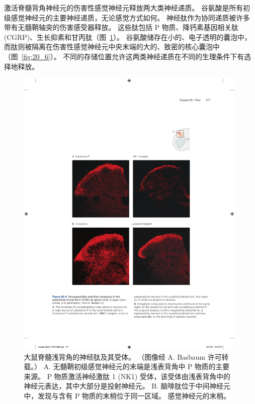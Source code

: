 激活脊髓背角神经元的伤害性感觉神经元释放两大类神经递质。
谷氨酸是所有初级感觉神经元的主要神经递质，无论感觉方式如何。
神经肽作为协同递质被许多带有无髓鞘轴突的伤害感受器释放。
这些肽包括 P 物质、降钙素基因相关肽 (CGRP)、生长抑素和甘丙肽（图~\ref{fig:20_5}）。
谷氨酸储存在小的、电子透明的囊泡中，而肽则被隔离在伤害性感觉神经元中央末端的大的、致密的核心囊泡中（图~\ref{fig:20_6}）。
不同的存储位置允许这两类神经递质在不同的生理条件下有选择地释放。


\begin{figure}[htbp]
	\centering
	\includegraphics[width=0.7\linewidth]{chap20/fig_20_5}
	\caption{大鼠脊髓浅背角的神经肽及其受体。 （图像经 A. Basbaum 许可转载。）
		A. 无髓鞘初级感觉神经元的末端是浅表背角中 P 物质的主要来源。
		P 物质激活神经激肽 1 (NK1) 受体，该受体由浅表背角中的神经元表达，其中大部分是投射神经元。
		B. 脑啡肽位于中间神经元中，发现与含有 P 物质的末梢位于同一区域。
		感觉神经元的末梢。}
	\label{fig:20_5}
\end{figure}


